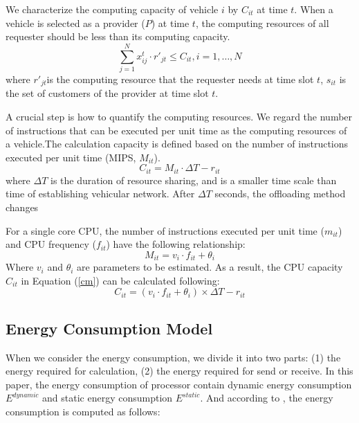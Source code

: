 \documentclass[conference]{IEEEtran}
\begin{document}
We characterize the computing capacity of vehicle $i$ by $C_ {it}$ at time $t$. When a vehicle is selected as a provider ($P$) at time $t$, the computing resources of all requester should be less than its computing capacity.
\begin{equation}
	\sum    \limits_{ j= 1} ^{N}
	{ x_{ij}^{t} \cdot  r'_{jt}} \le C_{it}, i = 1, \dots, N
\end{equation}
where $r'_ {jt} $is the computing resource that the requester needs at time slot $t$, $s_ {it}$ is the set of customers of the provider at time slot $t$. 

A crucial step is how to quantify the computing resources. We regard the number of instructions that can be executed per unit time as the computing resources of a vehicle.The calculation capacity is defined based on the number of instructions executed per unit time (MIPS, $M_{it}$). 
\begin{equation}
	C_{it} = M_{it}   \cdot \Delta T 
	- r_{it}
	\label{cm}
\end{equation}
where $\Delta T$ is the duration of resource sharing, and is a smaller time scale than time of establishing vehicular network. After $\Delta T$ seconds, the offloading method changes
%

For a single core CPU, the number of instructions executed per unit time ($m_{it}$) and CPU frequency ($f_{it}$) have the following relationship:
\begin{equation}
	M_{it} = v_i \cdot f_{it} + \theta_i
	\label{mf}
\end{equation}
Where $v_ {i} $ and $\theta_ i$ are parameters to be estimated.
As a result, the CPU capacity $C_{it}$ in Equation (\ref{cm}) can be calculated following:
\begin{equation}
	C_{it} = (v_i \cdot f_{it} + \theta_i)   \times \Delta T 
	- r_{it}
	\label{cf}
\end{equation}

\subsection{Energy Consumption Model}
	When we consider the energy consumption, we divide it into two parts: (1) the energy required for calculation, (2) the energy required for send or receive. In this paper\cite{dysta}, the energy consumption of processor contain dynamic energy consumption $E ^{dynamic}$ and static energy consumption $E^{static}$. 
	And according to \cite{efv}\cite{vf}\cite{3940}\cite{4039}, the energy consumption is computed as follows:
\end{document}
